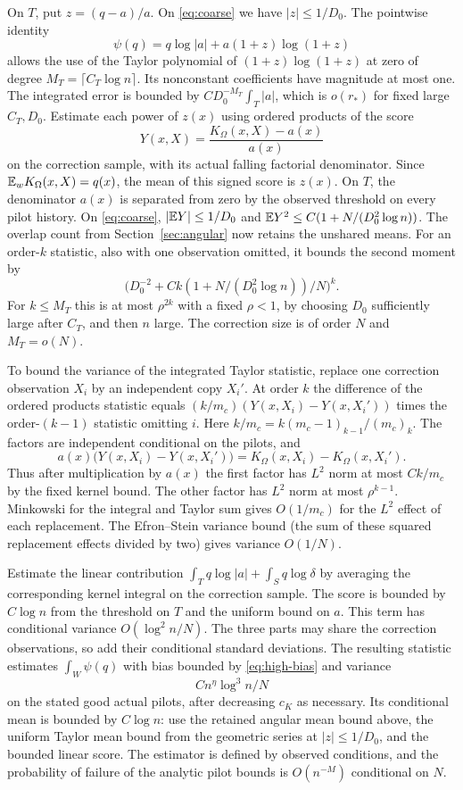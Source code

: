 On \(T\), put \(z=(q-a)/a\). On \eqref{eq:coarse} we have
\(|z|\le 1/D_0\). The pointwise identity
\[
 \psi(q)=q\log|a|+a(1+z)\log(1+z)
\]
allows the use of the Taylor polynomial of
\((1+z)\log(1+z)\) at zero of degree
\(M_T=\lceil C_T\log n\rceil\). Its nonconstant coefficients
have magnitude at most one. The integrated error is bounded by
\(C D_0^{-M_T}\int_T |a|\), which is \(o(r_*)\) for fixed
large \(C_T,D_0\). Estimate each power of \(z(x)\) using
ordered products of the score
\[
 Y(x,X)=\frac{K_\Omega(x,X)-a(x)}{a(x)}
\]
on the correction sample, with its actual falling factorial
denominator. Since \(\mathbb E_w K_\Omega(x,X)=q(x)\), the mean
of this signed score is \(z(x)\). On \(T\), the denominator
\(a(x)\) is separated
from zero by the observed threshold on every pilot history.
On \eqref{eq:coarse}, \(|\mathbb E Y|\le1/D_0\) and
\(\mathbb E Y^2\le C(1+N/(D_0^2\log n))\).
The overlap count from Section~\ref{sec:angular} now retains the
unshared means. For an order-\(k\) statistic, also with one
observation omitted, it bounds the second moment by
\[
 \bigl(D_0^{-2}+Ck(1+N/(D_0^2\log n))/N\bigr)^k .
\]
For \(k\le M_T\) this is at most \(\rho^{2k}\) with
a fixed \(\rho<1\), by choosing \(D_0\) sufficiently large
after \(C_T\), and then \(n\) large. The correction size
is of order \(N\) and \(M_T=o(N)\).

To bound the variance of the integrated Taylor statistic,
replace one correction observation \(X_i\) by an independent
copy \(X_i'\). At order \(k\) the difference of the ordered products statistic equals
\((k/m_c)(Y(x,X_i)-Y(x,X_i'))\) times the order-\((k-1)\)
statistic omitting \(i\). Here \(k/m_c=k(m_c-1)_{k-1}/(m_c)_k\).
The factors are independent conditional on the pilots, and
\[
 a(x)\bigl(Y(x,X_i)-Y(x,X_i')\bigr)
  = K_\Omega(x,X_i)-K_\Omega(x,X_i') .
\]
Thus after multiplication by \(a(x)\) the first factor has
\(L^2\) norm at most \(C k/m_c\)
by the fixed kernel bound. The other factor has \(L^2\) norm
at most \(\rho^{k-1}\). Minkowski for the integral and
Taylor sum gives \(O(1/m_c)\) for the \(L^2\) effect of
each replacement. The Efron--Stein variance bound (the sum
of these squared replacement effects divided by two) gives
variance \(O(1/N)\).

Estimate the linear contribution \(\int_T q\log|a|+
\int_S q\log\delta\) by averaging the corresponding
kernel integral on the correction sample. The score is bounded
by \(C\log n\) from the threshold on \(T\) and the uniform
bound on \(a\). This term has conditional variance
\(O(\log^2 n/N)\). The three parts may share the correction
observations, so add their conditional standard deviations.
The resulting statistic estimates \(\int_W\psi(q)\) with
bias bounded by \eqref{eq:high-bias} and variance
\begin{equation}\label{eq:high-var}
 C n^\eta\log^3 n/N
\end{equation}
on the stated good actual pilots, after decreasing \(c_K\)
as necessary. Its conditional mean is bounded by \(C\log n\):
use the retained angular mean bound above, the uniform Taylor
mean bound from the geometric series at \(|z|\le 1/D_0\),
and the bounded linear score. The estimator is defined by
observed conditions, and the probability of failure of the
analytic pilot bounds is \(O(n^{-M})\) conditional on \(N\).
